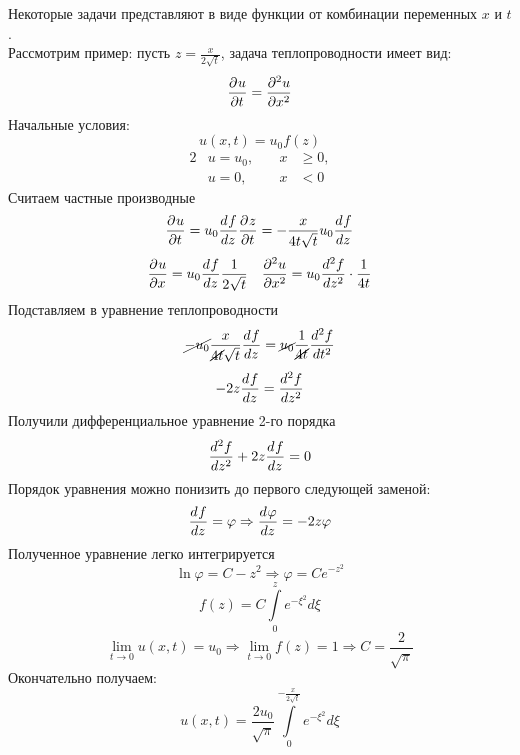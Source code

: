 Некоторые задачи  представляют в виде функции от комбинации переменных $x$ и $t$.\\
	Рассмотрим пример:
		пусть  $z = \frac{x}{2 \sqrt{t}}$, задача теплопроводности имеет вид:
		\[\frac{\partial^{}u}{\partial t^{}} = \frac{\partial^{2}u}{\partial x^{2}}\]
		Начальные условия:
		\[u(x, t) = u_0 f(z)\]
		\begin{alignat*}{2}			
			&u = u_0, &\quad x &\geqslant 0,\\
			&u = 0, &\quad x &< 0
		\end{alignat*}
		Считаем частные производные
		\[\frac{\partial^{}u}{\partial t^{}} = u_0 \frac{d^{}f}{dz^{}} \frac{\partial^{}z}{\partial t^{}} = - \frac{x}{4 t \sqrt{t}} u_0 \frac{d^{}f}{dz^{}}\]
		\[\frac{\partial^{}u}{\partial x^{}} = u_0 \frac{d^{}f}{dz^{}} \frac{1}{2 \sqrt{t}} \quad \frac{\partial^{2}u}{\partial x^{2}} = u_0 \frac{d^{2}f}{dz^{2}} \cdot \frac{1}{4 t}\]
		Подставляем в уравнение теплопроводности
		\[\cancel{- u_0} \frac{x}{\cancel{4t} \sqrt{t}} \frac{d^{}f}{dz^{}} = \cancel{u_0} \frac{1}{\cancel{4 t}} \frac{d^{2}f}{dt^{2}}\]
		\[-2 z \frac{d^{}f}{dz^{}} = \frac{d^{2}f}{dz^{2}}\]
		Получили дифференциальное уравнение 2-го порядка
		\[\frac{d^{2}f}{dz^{2}} + 2 z \frac{d^{}f}{dz^{}} = 0\]
		Порядок уравнения можно понизить до первого следующей заменой:
		\[\frac{d^{}f}{dz^{}} = \varphi \Rightarrow \frac{d^{}\varphi}{dz^{}} = - 2z \varphi\]
		Полученное уравнение легко интегрируется 
		\[\ln \varphi = C - z^2 \Rightarrow \varphi = C e^{-z^2}\]
		\[f(z) = C \int\limits_0^z e^{-\xi^2} d \xi\]
		\[\lim_{t \to 0} u(x, t) = u_0 \Rightarrow \lim_{t \to 0} f(z) = 1 \Rightarrow C = \frac{2}{\sqrt{\pi}}\]
		Окончательно получаем:
		\[u(x, t) =  \frac{2 u_0}{\sqrt{\pi}} \int\limits_0^{- \frac{x}{2 \sqrt{t}}} e^{- \xi^2} d\xi\]